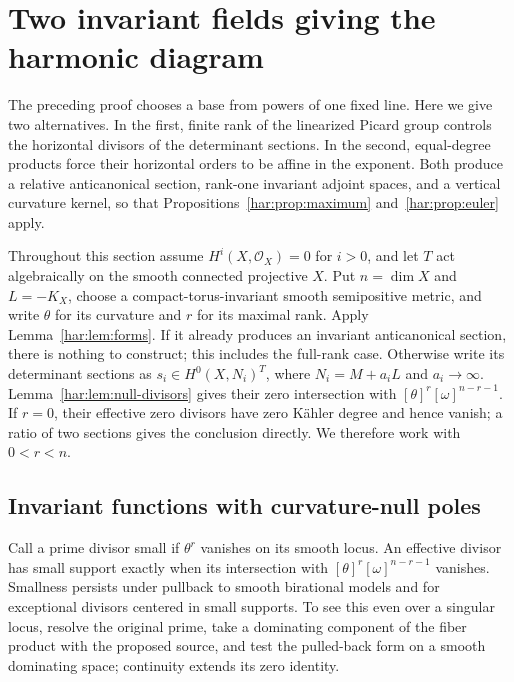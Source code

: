 \section{Two invariant fields giving the harmonic diagram}\label{har:sec:fields}

The preceding proof chooses a base from powers of one fixed line.
Here we give two alternatives. In the first, finite rank of the
linearized Picard group controls the horizontal divisors of the
determinant sections. In the second, equal-degree products force
their horizontal orders to be affine in the exponent. Both produce
a relative anticanonical section, rank-one invariant adjoint spaces,
and a vertical curvature kernel, so that
Propositions~\ref{har:prop:maximum} and~\ref{har:prop:euler} apply.

Throughout this section assume \(H^i(X,\mathcal O_X)=0\) for \(i>0\),
and let \(T\) act algebraically on the smooth connected projective
\(X\). Put \(n=\dim X\) and \(L=-K_X\), choose a compact-torus-invariant smooth
semipositive metric, and write \(\theta\) for its curvature and
\(r\) for its maximal rank. Apply Lemma~\ref{har:lem:forms}. If it
already produces an invariant anticanonical section, there is nothing
to construct; this includes the full-rank case. Otherwise write its
determinant sections as \(s_i\in H^0(X,N_i)^T\), where
\(N_i=M+a_iL\) and \(a_i\to\infty\).
Lemma~\ref{har:lem:null-divisors} gives their zero intersection with
\([\theta]^r[\omega]^{n-r-1}\). If \(r=0\), their effective zero
divisors have zero K\"ahler degree and hence vanish; a ratio of two
sections gives the conclusion directly. We therefore work with
\(0<r<n\).

\subsection{Invariant functions with curvature-null poles}\label{har:subsec:small}

Call a prime divisor small if \(\theta^r\) vanishes on its smooth
locus. An effective divisor has small support exactly when its
intersection with \([\theta]^r[\omega]^{n-r-1}\) vanishes.
Smallness persists under pullback to smooth birational
models and for exceptional divisors centered in small supports. To see
this even over a singular locus, resolve the original prime, take a
dominating component of the fiber product with the proposed source,
and test the pulled-back form on a smooth dominating space; continuity
extends its zero identity.

